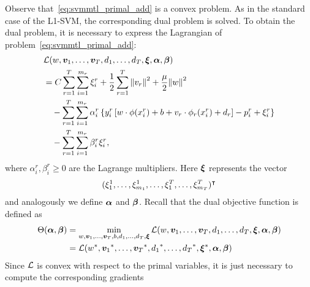 Observe that~\eqref{eq:svmmtl_primal_add} is a convex problem. As in the standard case of the L1-SVM, the corresponding dual problem is solved. To obtain the dual problem, it is necessary to express the Lagrangian of problem~\eqref{eq:svmmtl_primal_add}:
\begin{equation}\label{eq:svmmtl_lagrangian_add}
    \begin{aligned}
        & \lagr({w}, \fv{v}_1, \ldots, \fv{v}_\ntasks, d_1, \ldots, d_\ntasks, \fv{\xi}, \fv{\alpha}, \fv{\beta}) \\
        &= C \sum_{r= 1}^T \sum_{i=1}^{m_r} {\xi_{i}^r} + \frac{1}{2} \sum_{r= 1}^T{\norm{{v}_r}^2} + \frac{\mu}{2} {\norm{{w}}}^2 \\
        &\quad -  \sum_{r= 1}^T \sum_{i=1}^{m_r} \alpha_i^r \left\lbrace y_{i}^r \left[ {w} \cdot \phi(x_{i}^r) + b  + {v}_r \cdot \phi_r(x_{i}^r) + d_r \right] - p_{i}^r + \xi_{i}^r  \right\rbrace \\
        &\quad -  \sum_{r= 1}^T \sum_{i=1}^{m_r} \beta_i^r \xi_i^r ,
    \end{aligned}
\end{equation}
where $\alpha_i^r, \beta_i^r \geq 0$ are the Lagrange multipliers. Here $\bm{\xi}$ represents the vector $$(\xi_1^1, \ldots, \xi_{m_1}^1, \ldots, \xi_1^T, \ldots, \xi_{m_T}^T)^\intercal$$ and analogously we define $\bm{\alpha}$ and $\bm{\beta}$.
Recall that the dual objective function is defined as 
\begin{equation}\nonumber
    \begin{aligned}
         \Theta(\bm{\alpha}, \bm{\beta}) &=  \min_{{w}, \bm{v}_1, \ldots, \bm{v}_T, b, d_1, \ldots, d_T, \bm{\xi}} \mathcal{L}({w}, \bm{v}_1, \ldots, \bm{v}_T, d_1, \ldots, d_T, \bm{\xi}, \bm{\alpha}, \bm{\beta}) \\
         &= \mathcal{L}({{w}}^*, {\bm{v}_1}^*, \ldots, {\bm{v}_T}^*, {d_1}^*, \ldots, {d_T}^*, {\bm{\xi}}^*, \bm{\alpha}, \bm{\beta})
    \end{aligned}    
\end{equation}
Since $\mathcal{L}$ is convex with respect to the primal variables, it is just necessary to compute the corresponding gradients
